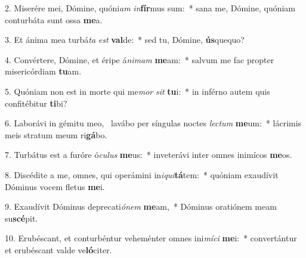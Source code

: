 2. Miserére mei, Dómine, quóni\textit{am} \textit{in}\textbf{fír}mus sum:~*  sana me, Dómine, quóniam conturbáta sunt ossa \textbf{me}a.\

3. Et ánima mea turbá\textit{ta} \textit{est} \textbf{val}de:~*  sed tu, Dómine, \textbf{ús}quequo?\

4. Convértere, Dómine, et éripe á\textit{ni}\textit{mam} \textbf{me}am:~*  salvum me fac propter misericórdiam \textbf{tu}am.\

5. Quóniam non est in morte qui me\textit{mor} \textit{sit} \textbf{tu}i:~*  in inférno autem quis confitébitur \textbf{ti}bi?\

6. Laborávi in gémitu meo, \dag\  lavábo per síngulas noctes \textit{lec}\textit{tum} \textbf{me}um:~*  lácrimis meis stratum meum ri\textbf{gá}bo.\

7. Turbátus est a furóre ó\textit{cu}\textit{lus} \textbf{me}us:~*  inveterávi inter omnes inimícos \textbf{me}os.\

8. Discédite a me, omnes, qui operámini in\textit{i}\textit{qui}\textbf{tá}tem:~*  quóniam exaudívit Dóminus vocem fletus \textbf{me}i.\

9. Exaudívit Dóminus deprecati\textit{ó}\textit{nem} \textbf{me}am,~*  Dóminus oratiónem meam su\textbf{scé}pit.\

10. Erubéscant, et conturbéntur veheménter omnes ini\textit{mí}\textit{ci} \textbf{me}i:~*  convertántur et erubéscant valde ve\textbf{ló}citer.\

